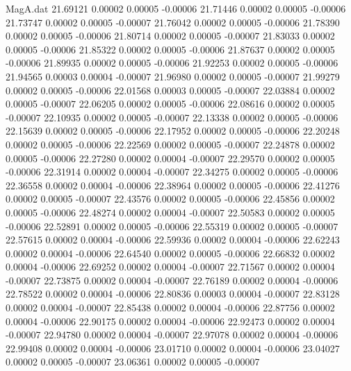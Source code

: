 \begin{filecontents}{MagA.dat}
  21.69121    0.00002    0.00005   -0.00006
  21.71446    0.00002    0.00005   -0.00006
  21.73747    0.00002    0.00005   -0.00007
  21.76042    0.00002    0.00005   -0.00006
  21.78390    0.00002    0.00005   -0.00006
  21.80714    0.00002    0.00005   -0.00007
  21.83033    0.00002    0.00005   -0.00006
  21.85322    0.00002    0.00005   -0.00006
  21.87637    0.00002    0.00005   -0.00006
  21.89935    0.00002    0.00005   -0.00006
  21.92253    0.00002    0.00005   -0.00006
  21.94565    0.00003    0.00004   -0.00007
  21.96980    0.00002    0.00005   -0.00007
  21.99279    0.00002    0.00005   -0.00006
  22.01568    0.00003    0.00005   -0.00007
  22.03884    0.00002    0.00005   -0.00007
  22.06205    0.00002    0.00005   -0.00006
  22.08616    0.00002    0.00005   -0.00007
  22.10935    0.00002    0.00005   -0.00007
  22.13338    0.00002    0.00005   -0.00006
  22.15639    0.00002    0.00005   -0.00006
  22.17952    0.00002    0.00005   -0.00006
  22.20248    0.00002    0.00005   -0.00006
  22.22569    0.00002    0.00005   -0.00007
  22.24878    0.00002    0.00005   -0.00006
  22.27280    0.00002    0.00004   -0.00007
  22.29570    0.00002    0.00005   -0.00006
  22.31914    0.00002    0.00004   -0.00007
  22.34275    0.00002    0.00005   -0.00006
  22.36558    0.00002    0.00004   -0.00006
  22.38964    0.00002    0.00005   -0.00006
  22.41276    0.00002    0.00005   -0.00007
  22.43576    0.00002    0.00005   -0.00006
  22.45856    0.00002    0.00005   -0.00006
  22.48274    0.00002    0.00004   -0.00007
  22.50583    0.00002    0.00005   -0.00006
  22.52891    0.00002    0.00005   -0.00006
  22.55319    0.00002    0.00005   -0.00007
  22.57615    0.00002    0.00004   -0.00006
  22.59936    0.00002    0.00004   -0.00006
  22.62243    0.00002    0.00004   -0.00006
  22.64540    0.00002    0.00005   -0.00006
  22.66832    0.00002    0.00004   -0.00006
  22.69252    0.00002    0.00004   -0.00007
  22.71567    0.00002    0.00004   -0.00007
  22.73875    0.00002    0.00004   -0.00007
  22.76189    0.00002    0.00004   -0.00006
  22.78522    0.00002    0.00004   -0.00006
  22.80836    0.00003    0.00004   -0.00007
  22.83128    0.00002    0.00004   -0.00007
  22.85438    0.00002    0.00004   -0.00006
  22.87756    0.00002    0.00004   -0.00006
  22.90175    0.00002    0.00004   -0.00006
  22.92473    0.00002    0.00004   -0.00007
  22.94780    0.00002    0.00004   -0.00007
  22.97078    0.00002    0.00004   -0.00006
  22.99408    0.00002    0.00004   -0.00006
  23.01710    0.00002    0.00004   -0.00006
  23.04027    0.00002    0.00005   -0.00007
  23.06361    0.00002    0.00005   -0.00007

\end{filecontents}
